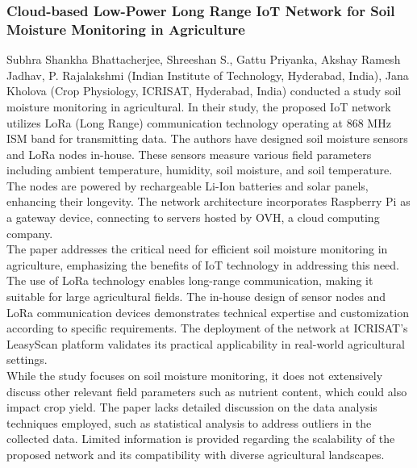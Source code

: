 \documentclass[12pt, a4paper]{article}
\begin{document}
\subsubsection{Cloud-based Low-Power Long Range IoT Network for Soil Moisture Monitoring in Agriculture}
Subhra Shankha Bhattacherjee, Shreeshan S., Gattu Priyanka, Akshay Ramesh Jadhav, P. Rajalakshmi (Indian Institute of Technology, Hyderabad, India), Jana Kholova (Crop Physiology, ICRISAT, Hyderabad, India)\cite{bhattacherjee2020cloud} conducted a study soil moisture monitoring in agricultural.
In their study, the proposed IoT network utilizes LoRa (Long Range) communication technology operating
at 868 MHz ISM band for transmitting data. The authors have designed soil moisture sensors and LoRa nodes in-house. These sensors measure various field parameters including ambient temperature, humidity, soil moisture, and soil temperature. The nodes are powered by rechargeable Li-Ion batteries and solar panels, enhancing their longevity. The network architecture incorporates Raspberry Pi as a gateway device, connecting to servers hosted by OVH, a cloud computing company.\\
The paper addresses the critical need for efficient soil moisture monitoring in agriculture,
emphasizing the benefits of IoT technology in addressing this need. The use of LoRa technology enables long-range communication, making it suitable for large agricultural fields. The in-house design of sensor nodes and LoRa communication devices demonstrates technical expertise and customization according to specific requirements. The deployment of the network at ICRISAT's LeasyScan platform validates its practical applicability in real-world agricultural settings.\\
While the study focuses on soil moisture monitoring, it does not extensively discuss other relevant field parameters such as nutrient content, which could also impact crop yield. The paper lacks detailed discussion on the data analysis techniques employed, such as statistical analysis to address outliers in the collected data. Limited information is provided regarding the scalability of the proposed network and its compatibility with diverse agricultural landscapes.
\end{document}
